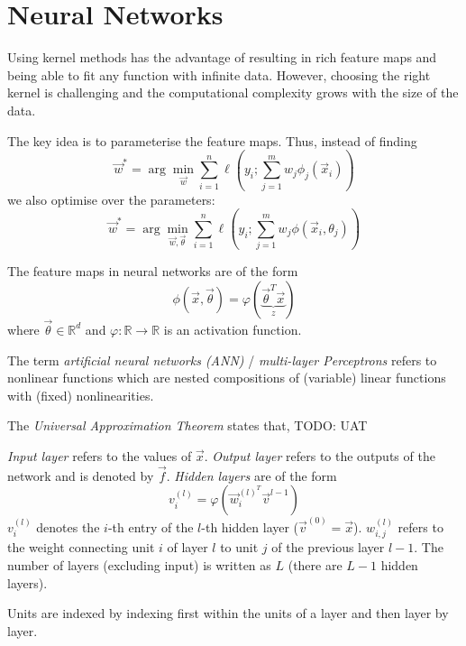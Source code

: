 \section{Neural Networks}
Using kernel methods has the advantage of resulting in rich
feature maps and being able to fit any function with infinite data.
However, choosing the right kernel is challenging and the
computational complexity grows with the size of the data.

The key idea is to parameterise the feature maps.
Thus, instead of finding
\begin{equation*}
    \vec{w}^* = \arg\min_{\vec{w}}{
        \sum_{i=1}^n{\ell\left(y_i; \sum_{j=1}^m{w_j \phi_j(\vec{x}_i)} \right)}
    }
\end{equation*}
we also optimise over the parameters:
\begin{equation*}
    \vec{w}^* = \arg\min_{\vec{w}, \vec{\theta}}{
        \sum_{i=1}^n{\ell\left(y_i; \sum_{j=1}^m{w_j \phi(\vec{x}_i, \theta_j)} \right)}
    }
\end{equation*}

The feature maps in neural networks are of the form
\begin{equation*}
    \phi(\vec{x}, \vec{\theta})
    = \varphi(\underbrace{\vec{\theta}^T \vec{x}}_{z})
\end{equation*}
where $\vec{\theta} \in \mathbb{R}^d$ and
$\varphi : \mathbb{R} \to \mathbb{R}$ is an activation function.

The term \emph{artificial neural networks (ANN)} /
\emph{multi-layer Perceptrons} refers to nonlinear functions
which are nested compositions of (variable) linear functions
with (fixed) nonlinearities.

The \emph{Universal Approximation Theorem} states that,
TODO: UAT

\emph{Input layer} refers to the values of $\vec{x}$.
\emph{Output layer} refers to the outputs of the network
and is denoted by $\vec{f}$.
\emph{Hidden layers} are of the form
\begin{equation*}
    v_i^{(l)} = \varphi(\vec{w}_i^{(l)^T} \vec{v}^{l-1})
\end{equation*}
$v_i^{(l)}$ denotes the $i$-th entry of the $l$-th hidden layer
($\vec{v}^{(0)} = \vec{x}$).
$w_{i,j}^{(l)}$ refers to the weight connecting unit
$i$ of layer $l$ to unit $j$ of the previous layer $l-1$.
The number of layers (excluding input) is written as
$L$ (there are $L - 1$ hidden layers).

Units are indexed by indexing first within the units of a layer
and then layer by layer.


